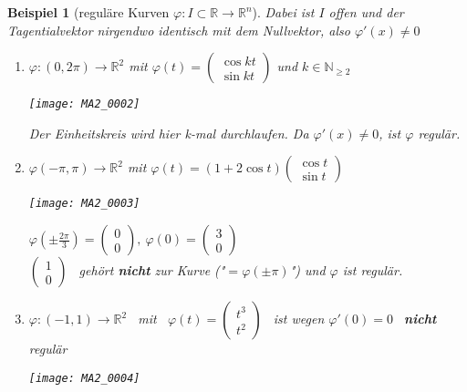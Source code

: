 \documentclass[a4paper,12pt,portrait]{book}
\theoremstyle{theoremstyle}
\newtheorem{beispiel}[theo]{Beispiel}
\begin{document}
\begin{beispiel}[reguläre Kurven $\varphi:I\subset\mathbb{R}\rightarrow\mathbb{R}^n$]
Dabei ist $I$ offen und der Tagentialvektor nirgendwo identisch mit dem Nullvektor, also $\varphi'(x)\neq 0$
\begin{enumerate}
\item $\varphi:(0,2\pi)\rightarrow\mathbb{R}^2$ mit $\varphi(t)=\begin{pmatrix}
\cos kt \\ \sin kt
\end{pmatrix}$ und $k\in\mathbb{N}_{\geq 2}$\\
\begin{center}\texttt{[image: MA2\_0002]}\\ \end{center}
Der Einheitskreis wird hier k-mal durchlaufen. Da $\varphi'(x)\neq 0$, ist $\varphi$ regulär.
\item $\varphi(-\pi,\pi)\rightarrow\mathbb{R}^2$ mit $\varphi(t)=(1+2\cos t)\begin{pmatrix}
\cos t \\ \sin t
\end{pmatrix}$\\
\begin{center}
\texttt{[image: MA2\_0003]}\\
\end{center}
$\varphi(\pm\frac{2\pi}{3})=\begin{pmatrix}
0 \\ 0
\end{pmatrix}, \ \varphi(0)=\begin{pmatrix}
3 \\ 0
\end{pmatrix}$\\
$\begin{pmatrix}
1 \\ 0
\end{pmatrix}$ \ gehört \textbf{nicht} zur Kurve ("$=\varphi(\pm\pi)$") und $\varphi$ ist regulär.
\item $\varphi:(-1,1)\rightarrow\mathbb{R}^2$ \ mit \ $\varphi(t)=\begin{pmatrix}
t^3 \\ t^2
\end{pmatrix}$ \ ist wegen $\varphi'(0)=0$ \ \textbf{nicht} regulär\\
\begin{center}
\texttt{[image: MA2\_0004]}
\end{center}
\end{enumerate}
\end{beispiel}
\end{document}
